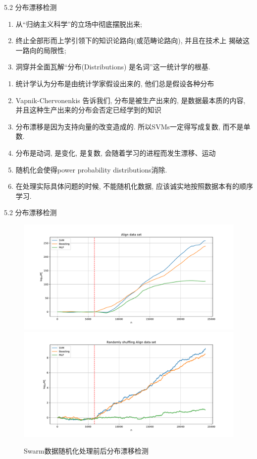 \documentclass[compress,10pt,dvipsnames,notheorems]{beamer} %
\begin{document}
\begin{frame}{5.2 分布漂移检测}
\begin{enumerate}
\item 从“归纳主义科学”的立场中彻底摆脱出来;
\item 终止全部形而上学引领下的知识论路向(或范畴论路向), 并且在技术上
揭破这一路向的局限性;
\item 洞穿并全面瓦解“分布(Distributions) 是名词”这一统计学的根基.
\end{enumerate}

\begin{solu}
\begin{enumerate}
\item 统计学认为分布是由统计学家假设出来的, 他们总是假设各种分布
\item Vapnik-Chervonenkis 告诉我们, 分布是被生产出来的, 是数据最本质的内容, 并且这种生产出来的分布会否定已经学到的知识
\item 分布漂移是因为支持向量的改变造成的. 所以SVMs一定得写成复数, 而不是单数.
\item 分布是动词, 是变化, 是复数, 会随着学习的进程而发生漂移、运动
\item 随机化会使得power probability distributions消除.
\item 在处理实际具体问题的时候, 不能随机化数据, 应该诚实地按照数据本有的顺序学习.
\end{enumerate}
\end{solu}
\end{frame}

\begin{frame}{5.2 分布漂移检测}
\begin{figure}[htbp]
\includegraphics[width=.7\linewidth]{Imgs/Align data set-icml}
\includegraphics[width=.7\linewidth]{Imgs/Randomly shuffling Align data sett-icml}
\caption{Swarm数据随机化处理前后分布漂移检测}
\label{fig:flock-mar}
\end{figure}
\end{frame}
\end{document}
